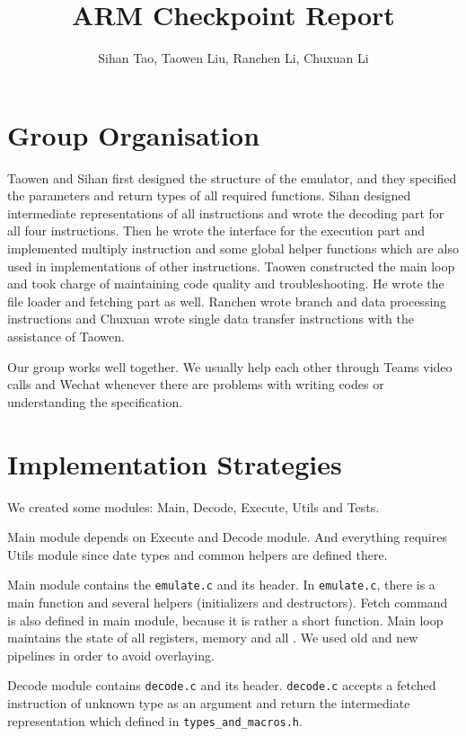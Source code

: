 \documentclass[10pt]{article}
\begin{document}
\title{ARM Checkpoint Report}
\author{Sihan Tao, Taowen Liu, Ranchen Li, Chuxuan Li}

\maketitle

\section{Group Organisation}

Taowen and Sihan first designed the structure of the emulator, and they specified the parameters and return types of all required functions. Sihan designed intermediate representations of all instructions and wrote the decoding part for all four instructions. Then he wrote the interface for the execution part and implemented multiply instruction and some global helper functions which are also used in implementations of other instructions. Taowen constructed the main loop and took charge of maintaining code quality and troubleshooting. He wrote the file loader and fetching part as well. Ranchen wrote branch and data processing instructions and Chuxuan wrote single data transfer instructions with the assistance of Taowen. 

Our group works well together. We usually help each other through Teams video calls and Wechat whenever there are problems with writing codes or understanding the specification.

\section{Implementation Strategies}

We created some modules: Main, Decode, Execute, Utils and Tests.

Main module depends on Execute and Decode module. And everything requires Utils module since date types and common helpers are defined there.

Main module contains the \texttt{emulate.c} and its header. In \texttt{emulate.c}, there is a main function and several helpers (initializers and destructors). Fetch command is also defined in main module, because it is rather a short function. Main loop maintains the state of all registers, memory and all . We used old and new pipelines in order to avoid overlaying.

Decode module contains \texttt{decode.c} and its header. \texttt{decode.c} accepts a fetched instruction of unknown type as an argument and return the intermediate representation which defined in \texttt{types\_and\_macros.h}.
\end{document}
